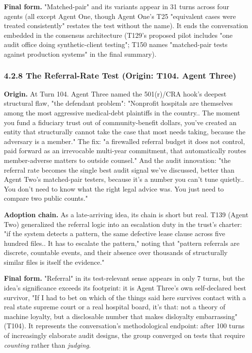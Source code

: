 \documentclass[sigconf,nonacm=true]{acmart}
\begin{document}
\textbf{Final form.} "Matched-pair" and its variants appear in 31 turns across four agents (all except Agent One, though Agent One's T25 "equivalent cases were treated consistently" restates the test without the name). It ends the conversation embedded in the consensus architecture (T129's proposed pilot includes "one audit office doing synthetic-client testing"; T150 names "matched-pair tests against production systems" in the final summary).

\subsubsection{4.2.8 The Referral-Rate Test (Origin: T104. Agent Three)}

\textbf{Origin.} At Turn 104. Agent Three named the 501(r)/CRA hook's deepest structural flaw,  "the defendant problem": "Nonprofit hospitals are themselves among the most aggressive medical-debt plaintiffs in the country.. The moment you fund a fiduciary trust out of community-benefit dollars, you've created an entity that structurally cannot take the case that most needs taking, because the adversary is a member." The fix: "a firewalled referral budget it does not control, paid forward as an irrevocable multi-year commitment, that automatically routes member-adverse matters to outside counsel." And the audit innovation: "the referral rate becomes the single best audit signal we've discussed,  better than Agent Two's matched-pair testers, because it's a number you can't tune quietly.. You don't need to know what the right legal advice was. You just need to compare two public counts."

\textbf{Adoption chain.} As a late-arriving idea, its chain is short but real. T139 (Agent Two) generalized the referral logic into an escalation duty in the trust's charter: "if the system detects a pattern,  the same defective lease clause across five hundred files.. It has to escalate the pattern," noting that "pattern referrals are discrete, countable events, and their absence over thousands of structurally similar files is itself the evidence."

\textbf{Final form.} "Referral" in its test-relevant sense appears in only 7 turns, but the idea's significance exceeds its footprint: it is Agent Three's own self-declared best survivor,  "If I had to bet on which of the things said here survives contact with a real state supreme court or a real hospital board, it's that: not a theory of machine loyalty, but a disclosable number that makes disloyalty embarrassing" (T104). It represents the conversation's methodological endpoint: after 100 turns of increasingly elaborate audit designs, the group converged on tests that require \textit{counting} rather than \textit{judging}.
\end{document}
